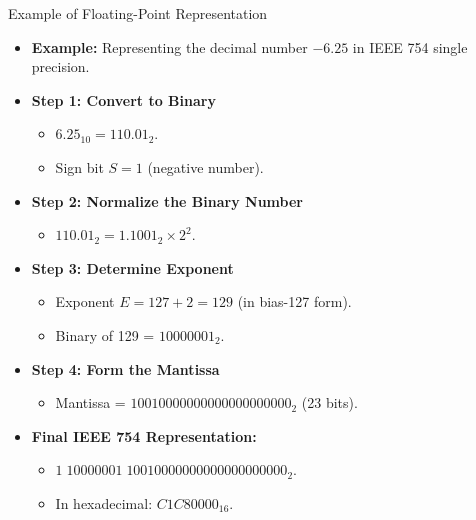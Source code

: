 \documentclass[aspectratio=169]{beamer}
\begin{document}
\begin{frame}{Example of Floating-Point Representation}
    \begin{itemize}
        \item \textbf{Example:} Representing the decimal number \( -6.25 \) in IEEE 754 single precision.
        \item \textbf{Step 1: Convert to Binary}
        \begin{itemize}
            \item \( 6.25_{10} = 110.01_2 \).
            \item Sign bit \( S = 1 \) (negative number).
        \end{itemize}
        \item \textbf{Step 2: Normalize the Binary Number}
        \begin{itemize}
            \item \( 110.01_2 = 1.1001_2 \times 2^2 \).
        \end{itemize}
        \item \textbf{Step 3: Determine Exponent}
        \begin{itemize}
            \item Exponent \( E = 127 + 2 = 129 \) (in bias-127 form).
            \item Binary of 129 = \( 10000001_2 \).
        \end{itemize}
        \item \textbf{Step 4: Form the Mantissa}
        \begin{itemize}
            \item Mantissa = \( 10010000000000000000000_2 \) (23 bits).
        \end{itemize}
        \item \textbf{Final IEEE 754 Representation:}
        \begin{itemize}
            \item \( 1\;10000001\;10010000000000000000000_2 \).
            \item In hexadecimal: \( C1C80000_{16} \).
        \end{itemize}
    \end{itemize}
\end{frame}
\end{document}
